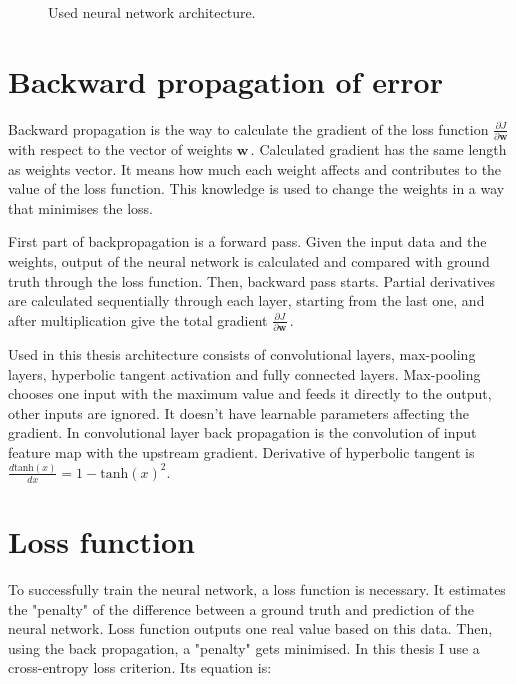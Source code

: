 \begin{figure}[!h]
  \centering
  
  
  
  \caption{Used neural network architecture.}
  \label{fig:architecture}
\end{figure}




\section{Backward propagation of error}
\label{backprop}

Backward propagation is the way to calculate the gradient of the loss function $\frac{\partial J}{\partial \textbf{w}}$ with respect to the vector of weights $\textbf{w}$\,. Calculated gradient has the same length as weights vector. It means how much each weight affects and contributes to the value of the loss function. This knowledge is used to change the weights in a way that minimises the loss. 

First part of backpropagation is a forward pass. Given the input data and the weights, output of the neural network is calculated and compared with ground truth through the loss function. Then, backward pass starts. Partial derivatives are calculated sequentially through each layer, starting from the last one, and after multiplication give the total gradient $\frac{\partial J}{\partial \textbf{w}}$\,.

Used in this thesis architecture consists of convolutional layers, max-pooling layers, hyperbolic tangent activation and fully connected layers. Max-pooling chooses one input with the maximum value and feeds it directly to the output, other inputs are ignored. It doesn't have learnable parameters affecting the gradient. In convolutional layer back propagation is the convolution of input feature map with the upstream gradient. Derivative of hyperbolic tangent is $\frac{d\textrm{tanh}(x)}{dx} = 1-\textrm{tanh}(x)^2$.



\section{Loss function}

To successfully train the neural network, a loss function is necessary. It estimates the "penalty" of the difference between a ground truth and prediction of the neural network. Loss function outputs one real value based on this data. Then, using the back propagation, a "penalty" gets minimised. In this thesis I use a cross-entropy loss criterion. Its equation is:

